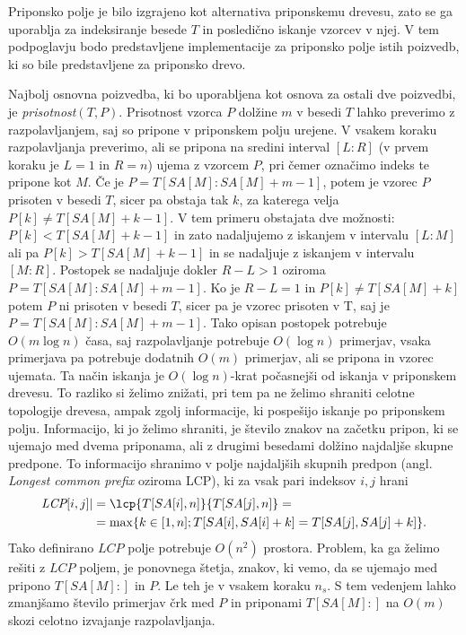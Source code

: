 Priponsko polje je bilo izgrajeno kot alternativa priponskemu drevesu, zato se ga uporablja za indeksiranje besede $T$ in posledično iskanje vzorcev v njej. V tem podpoglavju bodo predstavljene implementacije za priponsko polje istih poizvedb, ki so bile predstavljene za priponsko drevo.

Najbolj osnovna poizvedba, ki bo uporabljena kot osnova za ostali dve poizvedbi, je \textit{prisotnost}$(T,P)$. Prisotnost vzorca $P$ dolžine $m$ v besedi $T$ lahko preverimo z razpolavljanjem, saj so pripone v priponskem polju urejene. V vsakem koraku razpolavljanja preverimo, ali se pripona na sredini interval $[L:R]$ (v prvem koraku je $L=1$ in $R=n$) ujema z vzorcem $P$, pri čemer označimo indeks te pripone kot $M$. Če je $P=T[SA[M]:SA[M]+m-1]$, potem je vzorec $P$ prisoten v besedi $T$, sicer pa obstaja tak $k$, za katerega velja $P[k]\ne T[SA[M]+k-1]$. V tem primeru obstajata dve možnosti: $P[k]<T[SA[M]+k-1]$ in zato nadaljujemo z iskanjem v intervalu $[L:M]$ ali pa $P[k]>T[SA[M]+k-1]$ in se nadaljuje z iskanjem v intervalu $[M:R]$. Postopek se nadaljuje dokler $R-L>1$ oziroma $P=T[SA[M]:SA[M]+m-1]$. Ko je $R-L=1$ in $P[k]\ne T[SA[M]+k]$ potem $P$ ni prisoten v besedi $T$, sicer pa je vzorec prisoten v T, saj je $P=T[SA[M]:SA[M]+m-1]$. Tako opisan postopek potrebuje $O(m\log{n})$ časa, saj razpolavljanje potrebuje $O(\log{n})$ primerjav, vsaka primerjava pa potrebuje dodatnih $O(m)$ primerjav, ali se pripona in vzorec ujemata. Ta način iskanja je $O(\log{n})$-krat počasnejši od iskanja v priponskem drevesu. To razliko si želimo znižati, pri tem pa ne želimo shraniti celotne topologije drevesa, ampak zgolj informacije, ki pospešijo iskanje po priponskem polju. Informacijo, ki jo želimo shraniti, je število znakov na začetku pripon, ki se ujemajo med dvema priponama, ali z drugimi besedami dolžino najdaljše skupne predpone. To informacijo shranimo v polje najdaljših skupnih predpon (angl. \textit{Longest common prefix} oziroma LCP), ki za vsak pari indeksov $i,j$ hrani
    \begin{equation*} 
        \begin{split}
        \textit{LCP}[i,j]|&=\lcp{T[SA[i],n]}{T[SA[j],n]}=\\
         &=\max\{k\in[1,n];T[SA[i],SA[i]+k]=T[SA[j],SA[j]+k]\}.\\
        \end{split}
    \end{equation*}
Tako definirano $LCP$ polje potrebuje $O(n^2)$ prostora. Problem, ka ga želimo rešiti z $LCP$ poljem, je ponovnega štetja, znakov, ki vemo, da se ujemajo med pripono $T[SA[M]:]$ in $P$. Le teh je v vsakem koraku $n_s$. S tem vedenjem lahko zmanjšamo število primerjav črk med $P$ in priponami $T[SA[M]:]$ na $O(m)$ skozi celotno izvajanje razpolavljanja. 

